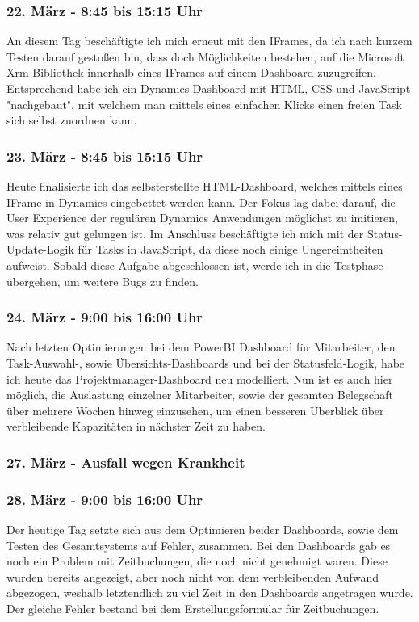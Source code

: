 \subsubsection*{22. März - 8:45 bis 15:15 Uhr}
An diesem Tag beschäftigte ich mich erneut mit den IFrames, da ich nach kurzem Testen darauf gestoßen bin, dass doch Möglichkeiten bestehen, auf die Microsoft Xrm-Bibliothek innerhalb eines IFrames auf einem Dashboard zuzugreifen. Entsprechend habe ich ein Dynamics Dashboard mit HTML, CSS und JavaScript "nachgebaut", mit welchem man mittels eines einfachen Klicks einen freien Task sich selbst zuordnen kann.

\subsubsection*{23. März - 8:45 bis 15:15 Uhr} 
Heute finalisierte ich das selbsterstellte HTML-Dashboard, welches mittels eines IFrame in Dynamics eingebettet werden kann. Der Fokus lag dabei darauf, die User Experience der regulären Dynamics Anwendungen möglichst zu imitieren, was relativ gut gelungen ist. Im Anschluss beschäftigte ich mich mit der Status-Update-Logik für Tasks in JavaScript, da diese noch einige Ungereimtheiten aufweist. Sobald diese Aufgabe abgeschlossen ist, werde ich in die Testphase übergehen, um weitere Bugs zu finden.

\subsubsection*{24. März - 9:00 bis 16:00 Uhr}
Nach letzten Optimierungen bei dem PowerBI Dashboard für Mitarbeiter, den Task-Auswahl-, sowie Übersichts-Dashboards und bei der Statusfeld-Logik, habe ich heute das Projektmanager-Dashboard neu modelliert. Nun ist es auch hier möglich, die Auslastung einzelner Mitarbeiter, sowie der gesamten Belegschaft über mehrere Wochen hinweg einzusehen, um einen besseren Überblick über verbleibende Kapazitäten in nächster Zeit zu haben.

\subsubsection*{27. März - Ausfall wegen Krankheit}

\subsubsection*{28. März - 9:00 bis 16:00 Uhr}
Der heutige Tag setzte sich aus dem Optimieren beider Dashboards, sowie dem Testen des Gesamtsystems auf Fehler, zusammen. Bei den Dashboards gab es noch ein Problem mit Zeitbuchungen, die noch nicht genehmigt waren. Diese wurden bereits angezeigt, aber noch nicht von dem verbleibenden Aufwand abgezogen, weshalb letztendlich zu viel Zeit in den Dashboards angetragen wurde. Der gleiche Fehler bestand bei dem Erstellungsformular für Zeitbuchungen. 

